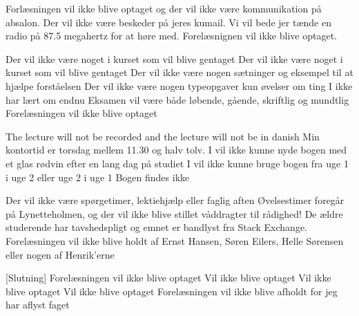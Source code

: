 \documentclass[a4paper,11pt]{article}
\begin{document}
\begin{song}
Forlæsningen vil ikke blive optaget og der vil ikke være kommunikation på absalon.
Der vil ikke være beskeder på jeres kumail.
Vi vil bede jer tænde en radio på 87.5 megahertz for at høre med.
Forelæsnignen vil ikke blive optaget.

Der vil ikke være noget i kurset som vil blive gentaget
Der vil ikke være noget i kurset som vil blive gentaget
Der vil ikke være nogen sætninger og eksempel til at hjælpe
forståelsen
Der vil ikke være nogen typeopgaver kun øvelser om ting I ikke
har lært om endnu
Eksamen vil være både løbende, gående, skriftlig og mundtlig
Forelæsningen vil ikke blive optaget

The lecture will not be recorded
and the lecture will not be in danish
Min kontortid er torsdag mellem 11.30 og halv tolv.
I vil ikke kunne nyde bogen med et glas rødvin efter en lang dag
på studiet
I vil ikke kunne bruge bogen fra uge 1 i uge 2 eller uge 2 i uge 1
Bogen findes ikke

Der vil ikke være spørgetimer, lektiehjælp eller faglig aften
Øvelsestimer foregår på Lynetteholmen, og der vil ikke blive stillet våddragter til rådighed!
De ældre studerende har tavshedspligt
og emnet er bandlyst fra Stack Exchange.
Forelæsningen vil ikke blive holdt af Ernst Hansen, Søren
Eilers, Helle Sørensen eller nogen af Henrik’erne

[Slutning] Forelæsningen vil ikke blive optaget
Vil ikke blive optaget
Vil ikke blive optaget
Vil ikke blive optaget
Forelæsningen vil ikke blive afholdt
for jeg har aflyst faget



\end{song}
\end{document}
